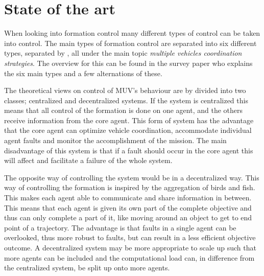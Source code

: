 \section{State of the art}
When looking into formation control many different types of control can be taken into control. The main types of formation control are separated into six different types, separated by \cite{muv-survey}, all under the main topic \textit{multiple vehicles coordination strategies}. The overview for this can be found in the survey paper \cite{muv-survey} who explains the six main types and a few alternations of these.

The theoretical views on control of \ac{MUV}'s behaviour are by \cite{muv-survey} divided into two classes; centralized and decentralized systems. If the system is centralized this means that all control of the formation is done on one agent, and the others receive information from the core agent. This form of system has the advantage that the core agent can optimize vehicle coordination, accommodate individual agent faults and monitor the accomplishment of the mission. The main disadvantage of this system is that if a fault should occur in the core agent this will affect and facilitate a failure of the whole system.

The opposite way of controlling the system would be in a decentralized way. This way of controlling the formation is inspired by the aggregation of birds and fish. This makes each agent able to communicate and share information in between. This means that each agent is given its own part of the complete objective and thus can only complete a part of it, like moving around an object to get to end point of a trajectory. The advantage is that faults in a single agent can be overlooked, thus more robust to faults, but can result in a less efficient objective outcome. A decentralized system may be more appropriate to scale up such that more agents can be included and the computational load can, in difference from the centralized system, be split up onto more agents.

